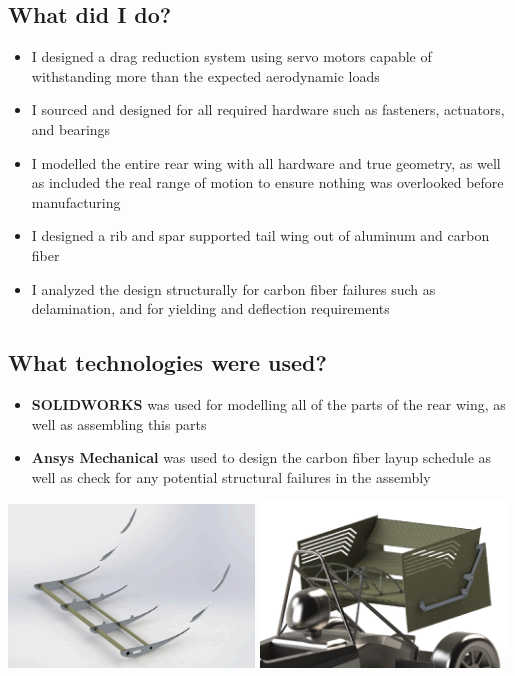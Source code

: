 \documentclass{article}
\begin{document}
\begin{multicols}{2}
    \subsection*{What did I do?}
    \begin{itemize}
        \item I designed a drag reduction system using servo motors capable of withstanding more than the expected aerodynamic loads
        \item I sourced and designed for all required hardware such as fasteners, actuators, and bearings
        \item I modelled the entire rear wing with all hardware and true geometry, as well as included the real range of motion to ensure nothing was overlooked before manufacturing
        \item I designed a rib and spar supported tail wing out of aluminum and carbon fiber
        \item I analyzed the design structurally for carbon fiber failures such as delamination, and for yielding and deflection requirements  
    \end{itemize}
    \subsection*{What technologies were used?}
    \begin{itemize}
        \item \textbf{SOLIDWORKS} was used for modelling all of the parts of the rear wing, as well as assembling this parts
        \item \textbf{Ansys Mechanical} was used to design the carbon fiber layup schedule as well as check for any potential structural failures in the assembly
    \end{itemize}
    \begin{center}
        \includegraphics[width=0.49\textwidth]{images/rib_and_spar.png}
        \includegraphics[width=0.49\textwidth]{images/integrated_rear_wing.png}
    \end{center}
\end{multicols}
        
\end{document}
